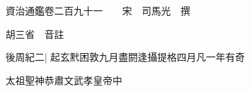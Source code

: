 






























































資治通鑑卷二百九十一　　宋　司馬光　撰

胡三省　音註

後周紀二|{
	起玄黓困敦九月盡閼逢攝提格四月凡一年有奇}


太祖聖神恭肅文武孝皇帝中

